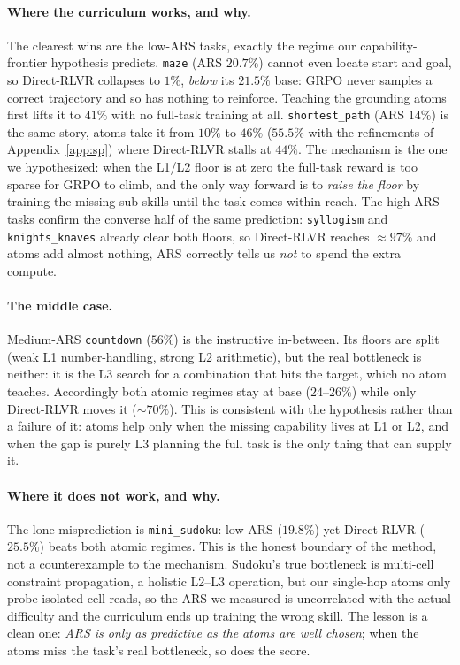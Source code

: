 \documentclass{article}
\begin{document}
\paragraph{Where the curriculum works, and why.} The clearest wins are the low-ARS tasks, exactly
the regime our capability-frontier hypothesis predicts. \texttt{maze} (ARS $20.7\%$) cannot even
locate start and goal, so Direct-RLVR collapses to $1\%$, \emph{below} its $21.5\%$ base: GRPO
never samples a correct trajectory and so has nothing to reinforce. Teaching the grounding atoms
first lifts it to $41\%$ with no full-task training at all. \texttt{shortest\_path} (ARS $14\%$) is
the same story, atoms take it from $10\%$ to $46\%$ ($55.5\%$ with the refinements of
Appendix~\ref{app:sp}) where Direct-RLVR stalls at $44\%$. The mechanism is the one we hypothesized:
when the L1/L2 floor is at zero the full-task reward is too sparse for GRPO to climb, and the only
way forward is to \emph{raise the floor} by training the missing sub-skills until the task comes
within reach. The high-ARS tasks confirm the converse half of the same prediction: \texttt{syllogism}
and \texttt{knights\_knaves} already clear both floors, so Direct-RLVR reaches $\approx 97\%$ and
atoms add almost nothing, ARS correctly tells us \emph{not} to spend the extra compute.

\paragraph{The middle case.} Medium-ARS \texttt{countdown} ($56\%$) is the instructive in-between.
Its floors are split (weak L1 number-handling, strong L2 arithmetic), but the real bottleneck is
neither: it is the L3 search for a combination that hits the target, which no atom teaches.
Accordingly both atomic regimes stay at base ($24$--$26\%$) while only Direct-RLVR moves it
($\sim$$70\%$). This is consistent with the hypothesis rather than a failure of it: atoms help only
when the missing capability lives at L1 or L2, and when the gap is purely L3 planning the full task
is the only thing that can supply it.

\paragraph{Where it does not work, and why.} The lone misprediction is \texttt{mini\_sudoku}: low
ARS ($19.8\%$) yet Direct-RLVR ($25.5\%$) beats both atomic regimes. This is the honest boundary of
the method, not a counterexample to the mechanism. Sudoku's true bottleneck is multi-cell constraint
propagation, a holistic L2--L3 operation, but our single-hop atoms only probe isolated cell reads, so
the ARS we measured is uncorrelated with the actual difficulty and the curriculum ends up training
the wrong skill. The lesson is a clean one: \emph{ARS is only as predictive as the atoms are well
chosen}; when the atoms miss the task's real bottleneck, so does the score.
\end{document}
